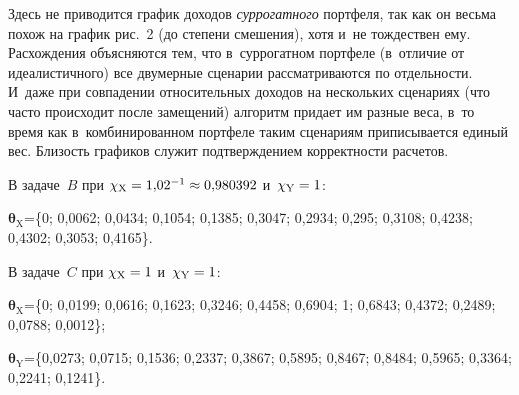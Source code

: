 \begin{multicols}{2}
  \vspace*{3pt}
  
  Здесь не приводится график доходов \textit{суррогатного} портфеля, так как 
он весьма похож на график рис.~2 (до степени смешения), хотя и~не тождествен 
ему. Расхождения объясняются тем, что в~суррогатном портфеле (в~отличие от 
идеалистичного) все двумерные сценарии рассматриваются по отдельности. 
И~даже при совпадении относительных доходов на нескольких сценариях (что 
часто происходит после замещений) алгоритм придает им разные веса, в~то 
время как в~комбинированном портфеле таким сценариям приписывается 
единый вес. Близость графиков служит подтверждением корректности 
расчетов. 
  
  В задаче~$B$ при $\chi_{\mathrm{X}}\hm= 1{,}02^{-1}
  \hm\approx 0{,}980392$ и~$\chi_{\mathrm{Y}}\hm = 1$:
  
  \vspace*{3pt}
  
 \noindent
  $\boldsymbol{\theta}_{\mathrm{X}}$\;=\;\{0; 0,0062; 0,0434; 0,1054; 0,1385; 0,3047; 
0,2934; 0,295; 0,3108; 0,4238; 0,4302; 0,3053; 0,4165\}. 

  \vspace*{3pt}
  
  В задаче~$C$ при $\chi_{\mathrm{X}}\hm = 1$ и~$\chi_{\mathrm{Y}}\hm = 1$:
  
    \vspace*{3pt}
  
  \noindent
  $\boldsymbol{\theta}_{\mathrm{X}}$\;=\;\{0; 0,0199; 0,0616; 0,1623; 0,3246; 0,4458; 
0,6904; 1; 0,6843; 0,4372; 0,2489; 0,0788; 0,0012\};

  \vspace*{3pt}
  
  \noindent
  $\boldsymbol{\theta}_{\mathrm{Y}}$\;=\;\{0,0273; 0,0715; 0,1536; 0,2337; 0,3867; 0,5895; 
0,8467; 0,8484; 0,5965; 0,3364; 0,2241; 0,1241\}. 
  
  \vspace*{3pt}
    

\end{multicols}
